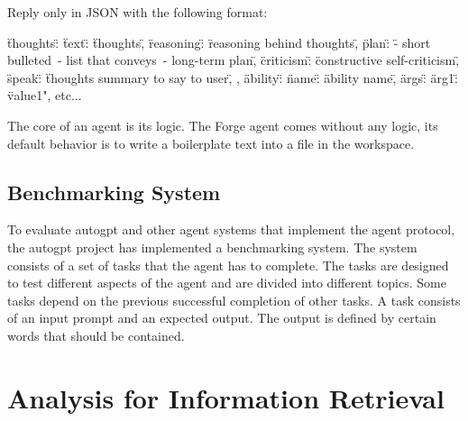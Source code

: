 \documentclass[../main.tex]{subfiles}
\begin{document}
\begin{Code}[
            caption={The system format of the Forge agent.
                        The language model is asked to only answer in this format.
                        The thoughts before creating the output for the user (speak),
                        the LLM generates reasoning, a plan and criticism.
                        After the model generated its thoughts,
                        it generates an ability proposal with the corresponding arguments.},
            label={lst:system-format},
            captionpos=b,
            float=tp]
      Reply only in JSON with the following format:

      {
      \"thoughts\": {
      \"text\":  \"thoughts\",
      \"reasoning\": \"reasoning behind thoughts\",
      \"plan\": \"- short bulleted\
      - list that conveys\
      - long-term plan\",
      \"criticism\": \"constructive self-criticism\",
      \"speak\": \"thoughts summary to say to user\",
      },
      \"ability\": {
      \"name\": \"ability name\",
      \"args\": {
      \"arg1\": \"value1", etc...
      }
      }
      }
\end{Code}

The core of an agent is its logic.
The Forge agent comes without any logic,
its default behavior is to write a boilerplate text into a file in the workspace.

\subsection{Benchmarking System}
\label{subsec:benchmarking}

To evaluate \gls{autogpt} and other agent systems that implement the agent protocol,
the \gls{autogpt} project has implemented a benchmarking system.
The system consists of a set of tasks that the agent has to complete.
The tasks are designed to test different aspects of the agent and are divided into different topics.
Some tasks depend on the previous successful completion of other tasks.
A task consists of an input prompt and an expected output.
The output is defined by certain words that should be contained.

\section{Analysis for Information Retrieval}
\label{sec:analysis}

\end{document}
